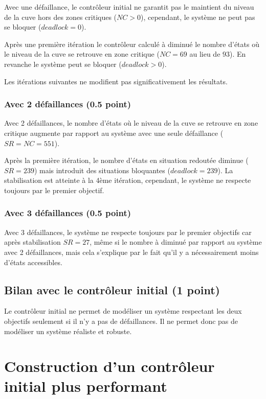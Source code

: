 \documentclass[a4paper]{book}
\begin{document}
Avec une défaillance, le contrôleur initial ne garantit pas le maintient du
niveau de la cuve hors des zones critiques ($NC > 0$), cependant, le système ne
peut pas se bloquer ($deadlock = 0$).

Après une première itération le contrôleur calculé à diminué le nombre d'états
où le niveau de la cuve se retrouve en zone critique ($NC = 69$ au lieu de
$93$). En revanche le système peut se bloquer ($deadlock > 0$).

Les itérations suivantes ne modifient pas significativement les résultats.

\subsubsection{Avec 2 défaillances (0.5 point)}

Avec 2 défaillances, le nombre d'états où le niveau de la cuve se retrouve en
zone critique augmente par rapport au système avec une seule défaillance ($SR = NC = 551$).

Après la première itération, le nombre d'états en situation redoutée diminue ($SR = 239$)
mais introduit des situations bloquantes ($deadlock = 239$).
La stabilisation est atteinte à la 4ème itération, cependant, le système ne respecte toujours
par le premier objectif.

\subsubsection{Avec 3 défaillances (0.5 point)}

Avec 3 défaillances, le système ne respecte toujours par le premier objectifs car après
stabilisation $SR = 27$, même si le nombre à diminué par rapport au système avec 2 défaillances,
mais cela s'explique par le fait qu'il y a nécessairement moins d'états accessibles.

\subsection{Bilan avec le contrôleur initial (1 point)}

Le contrôleur initial ne permet de modéliser un système respectant les deux
objectifs seulement si il n'y a pas de défaillances. Il ne permet donc pas de
modéliser un système réaliste et robuste.

\section{Construction d'un contrôleur initial plus performant}
\end{document}
